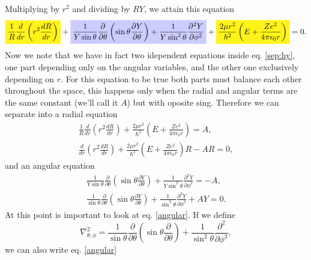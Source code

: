 \begin{questions}
\begin{solution}
\begin{equation*}
  \end{equation*}
  Multiplying by $r^2$ and dividing by $RY$, we attain this equation
  \begin{equation}
    \hlyellow{\frac{1}{R} \frac{d}{d r} \left(r^2\frac{d R}{d r}\right)} + \hlblue{\frac{1}{Y \sin{\theta}}\frac{\partial}{\partial \theta}\left(\sin{\theta}\frac{\partial Y}{\partial \theta}\right) + \frac{1}{Y\sin^2{\theta}}\frac{\partial^2 Y}{\partial \phi^2}} + \hlyellow{\frac{2\mu r^2}{\hbar^2}\left(E + \frac{Ze^2}{4\pi\epsilon_0r} \right)} = 0.
    \label{sep:hy}
  \end{equation}
  Now we note that we have in fact two idependent equations inside eq. \ref{sep:hy}, one part depending only on the angular variables, and the other one exclusively depending on $r$. For this equation to be true both parts must balance each other throughout the space, this happens only when the radial and angular terms are the same constant (we'll call it $A$) but with oposite sing. Therefore we can separate into a radial equation
  \begin{eqnarray}
    \frac{1}{R} \frac{d}{d r} \left(r^2\frac{d R}{d r}\right) + \frac{2\mu r^2}{\hbar^2}\left(E + \frac{Ze^2}{4\pi\epsilon_0r} \right)  = A, \nonumber\\
    \frac{d}{d r} \left(r^2\frac{d R}{d r}\right) + \frac{2\mu r^2}{\hbar^2}\left(E + \frac{Ze^2}{4\pi\epsilon_0r} \right)R - AR  = 0,
    \label{radial}
  \end{eqnarray}
  and an angular equation
  \begin{eqnarray}
    \frac{1}{Y \sin{\theta}}\frac{\partial}{\partial \theta}\left(\sin{\theta}\frac{\partial Y}{\partial \theta}\right) + \frac{1}{Y\sin^2{\theta}}\frac{\partial^2 Y}{\partial \phi^2}
    = - A ,\nonumber \\
    \frac{1}{ \sin{\theta}}\frac{\partial}{\partial \theta}\left(\sin{\theta}\frac{\partial Y}{\partial \theta}\right) + \frac{1}{\sin^2{\theta}}\frac{\partial^2 Y}{\partial \phi^2} + AY
    = 0.
    \label{angular}
  \end{eqnarray}
  At this point is important to look at eq. \ref{angular}. If we define
  \begin{equation*}
    \nabla^2_{\theta,\phi} = \frac{1}{ \sin{\theta}}\frac{\partial}{\partial \theta}\left(\sin{\theta}\frac{\partial }{\partial \theta}\right) + \frac{1}{\sin^2{\theta}}\frac{\partial^2 }{\partial \phi^2},
  \end{equation*}
  we can also write eq. \ref{angular}
  \begin{eqnarray}

\end{eqnarray}
\end{solution}
\end{questions}
